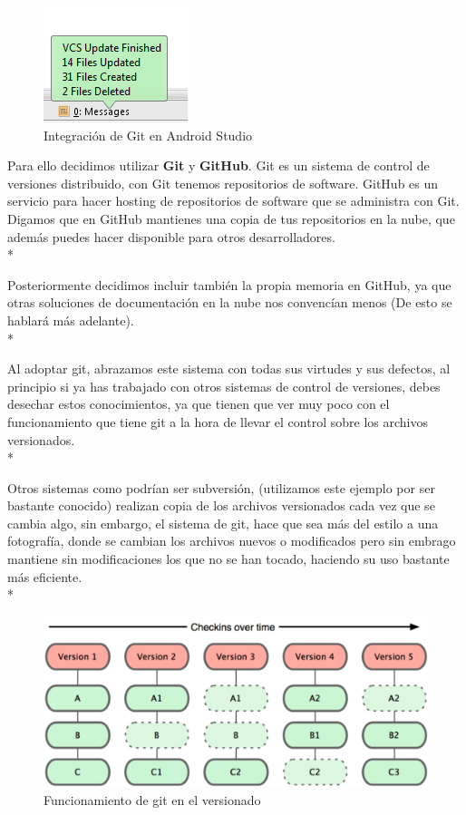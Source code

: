 \documentclass[../pfc.tex]{subfiles}
\begin{document}
	\begin{figure}[h]
		\centering
		\includegraphics[width=0.4\linewidth]{../images/VCS}
		\caption{Integración de Git en Android Studio}
		\label{fig:VCS}
	\end{figure}

	Para ello decidimos utilizar \textbf{Git} y \textbf{GitHub}.
	Git es un sistema de control de versiones distribuido, con Git tenemos repositorios de software. GitHub es un servicio para hacer hosting de repositorios de software que se administra con Git. Digamos que en GitHub mantienes una copia de tus repositorios en la nube, que además puedes hacer disponible para otros desarrolladores\cite{gitexplicacion}.\\* 
	
	Posteriormente decidimos incluir también la propia memoria en GitHub, ya que otras soluciones de documentación en la nube nos convencían menos (De esto se hablará más adelante).\\*
	
	
	
	Al adoptar git, abrazamos este sistema con todas sus virtudes y sus defectos, al principio si ya has trabajado con otros sistemas de control de versiones, debes desechar estos conocimientos, ya que tienen que ver muy poco con el funcionamiento que tiene git a la hora de llevar el control sobre los archivos versionados.\\*
	
	Otros sistemas como podrían ser subversión, (utilizamos este ejemplo por ser bastante conocido) realizan copia de los archivos versionados cada vez que se cambia algo, sin embargo, el sistema de git, hace que sea más del estilo a una fotografía, donde se cambian los archivos nuevos o modificados pero sin embrago mantiene sin modificaciones los que no se han tocado, haciendo su uso bastante más eficiente\cite{funcgit2}.\\*
	
	\begin{figure}[h]
	\centering
	\includegraphics[width=0.7\linewidth]{../images/funcionamiento_git}
	\caption{Funcionamiento de git en el versionado}
	\label{fig:funcionamiento_git}
	\end{figure}
\end{document}
